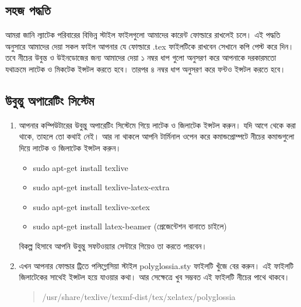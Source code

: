 \subsection{সহজ পদ্ধতি}
আমরা জানি ল্যাটেক পরিবারের বিভিন্ন স্টাইল ফাইলগুলো আমাদের কারেন্ট ফোল্ডারে রাখলেই চলে। এই পদ্ধতি অনুসারে আমাদের দেয়া সকল ফাইল আপনার যে ফোল্ডারে .tex ফাইলটিকে রাখবেন সেখানে কপি পেস্ট করে দিন। তবে নীচের উবুন্ত ও উইনডোজের জন্য আমাদের দেয়া ১ নম্বর ধাপ গুলো অনুসরণ করে আপনাকে দরকারমতো যথাক্রমে লাটেক ও মিকটেক ইন্সটল করতে হবে। তারপর ৪ নম্বর ধাপ অনুসরণ করে ফন্টও ইন্সটল করতে হবে। 
\subsection{উবুন্তু অপারেটিং সিস্টেম}

\begin{enumerate}
\item আপনার কম্পিউটারের উবুন্তু অপারেটিং সিস্টেমে গিয়ে লাটেক ও জিলাটেক ইন্সটল করুন। যদি আগে থেকে করা থাকে, তাহলে তো কথাই নেই। আর না থাকলে আপনি টার্মিনাল ওপেন করে কমান্ডপ্রোম্পটে নীচের কমান্ডগুলো দিয়ে লাটেক ও জিলাটেক ইন্সটল করুন। 
\begin{itemize}
\item sudo apt-get install texlive
\item sudo apt-get install texlive-latex-extra
\item sudo apt-get install texlive-xetex
\item sudo apt-get install latex-beamer (প্রেজেন্টেশন বানাতে চাইলে)
\end{itemize}

বিকল্প হিসাবে আপনি উবুন্তু সফটওয়্যার সেন্টারে গিয়েও তা করতে পারবেন।
\item এখন আপনার ফোল্ডার ট্রিতে পলিগ্লোসিয়া স্টাইল polyglossia.sty ফাইলটি খুঁজে বের করুন। এই ফাইলটি জিলাটেকের সাথেই ইন্সটল হয়ে যাওয়ার কথা। আর সেক্ষেত্রে খুব সম্ভবত এই ফাইলটি নীচের পাথে থাকবে।
\begin{quote}/usr/share/texlive/texmf-dist/tex/xelatex/polyglossia\end{quote}


\end{enumerate}
